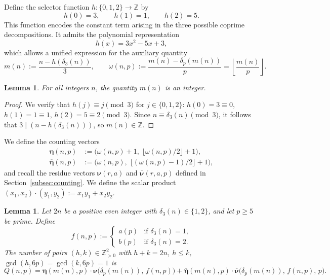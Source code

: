 \documentclass[12pt]{article}
\newtheorem{lemma}[theorem]{Lemma}
\begin{document}
Define the selector function $h:\{0,1,2\}\to\mathbb{Z}$ by
\[
h(0)=3,\qquad h(1)=1,\qquad h(2)=5.
\]
This function encodes the constant term arising in the three possible
coprime decompositions. It admits the polynomial representation
\[
h(x)=3x^2-5x+3,
\]
which allows a unified expression for the auxiliary quantity
\begin{equation}\label{eq:omegas}
m(n) := \frac{n-h(\delta_3(n))}{3},
\qquad
\omega(n,p) := \frac{m(n)-\delta_p(m(n))}{p}
= \left\lfloor\frac{m(n)}{p}\right\rfloor.
\end{equation}

\begin{lemma}\label{lem:m_integer}
For all integers $n$, the quantity $m(n)$ is an integer.
\end{lemma}

\begin{proof}
We verify that $h(j) \equiv j \pmod{3}$ for $j \in \{0,1,2\}$:
$h(0)=3\equiv 0$, $h(1)=1\equiv 1$, $h(2)=5\equiv 2 \pmod{3}$.
Since $n \equiv \delta_3(n) \pmod{3}$, it follows that
$3 \mid (n-h(\delta_3(n)))$, so $m(n) \in \mathbb{Z}$.
\end{proof}

We define the counting vectors
\begin{align}
\bm{\eta}(n,p)
&:= \bigl(\omega(n,p)+1,\;
          \lfloor\omega(n,p)/2\rfloor+1\bigr),
\label{eq:eta}\\
\overline{\bm{\eta}}(n,p)
&:= \bigl(\omega(n,p),\;
          \lfloor(\omega(n,p)-1)/2\rfloor+1\bigr),
\label{eq:etabar}
\end{align}
and recall the residue vectors $\bm{\nu}(r,a)$ and
$\overline{\bm{\nu}}(r,a,p)$ defined in
Section~\ref{subsec:counting}.
We define the scalar product
$(x_1,x_2)\cdot(y_1,y_2) := x_1y_1+x_2y_2$.

\begin{lemma}\label{lema:conteo_soluciones}
Let $2n$ be a positive even integer with $\delta_3(n)\in\{1,2\}$,
and let $p \ge 5$ be prime. Define
\[
f(n,p) :=
\begin{cases}
a(p) & \text{if } \delta_3(n)=1,\\
b(p) & \text{if } \delta_3(n)=2.
\end{cases}
\]
The number of pairs $(h,k) \in \mathbb{Z}_{>0}^2$ with
$h+k=2n$, $h \le k$, $\gcd(h,6p)=\gcd(k,6p)=1$ is
\begin{equation}\label{eq:Q}
Q(n,p)
=
\bm{\eta}(m(n),p)
\cdot
\bm{\nu}\!\bigl(\delta_p(m(n)),\,f(n,p)\bigr)
+
\overline{\bm{\eta}}(m(n),p)
\cdot
\overline{\bm{\nu}}\!\bigl(\delta_p(m(n)),\,f(n,p),\,p\bigr).
\end{equation}
\end{lemma}
\end{document}

